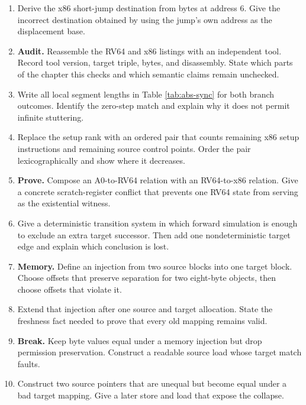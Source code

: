 \begin{enumerate}
\item Derive the x86 short-jump destination from bytes  at address
6. Give the incorrect destination obtained by using the jump's own address as
the displacement base.

\item \textbf{Audit.} Reassemble the RV64 and x86 listings with an independent
tool. Record tool version, target triple, bytes, and disassembly. State which
parts of the chapter this checks and which semantic claims remain unchecked.

\item Write all local segment lengths in Table \ref{tab:abs-sync} for both
branch outcomes. Identify the zero-step match and explain why it does not
permit infinite stuttering.

\item Replace the setup rank with an ordered pair that counts remaining x86
setup instructions and remaining source control points. Order the pair
lexicographically and show where it decreases.

\item \textbf{Prove.} Compose an A0-to-RV64 relation with an RV64-to-x86
relation. Give a concrete scratch-register conflict that prevents one RV64
state from serving as the existential witness.

\item Give a deterministic transition system in which forward simulation is
enough to exclude an extra target successor. Then add one nondeterministic
target edge and explain which conclusion is lost.

\item \textbf{Memory.} Define an injection from two source blocks into one
target block. Choose offsets that preserve separation for two eight-byte
objects, then choose offsets that violate it.

\item Extend that injection after one source and target allocation. State the
freshness fact needed to prove that every old mapping remains valid.

\item \textbf{Break.} Keep byte values equal under a memory injection but drop
permission preservation. Construct a readable source load whose target match
faults.

\item Construct two source pointers that are unequal but become equal under a
bad target mapping. Give a later store and load that expose the collapse.


\end{enumerate}
